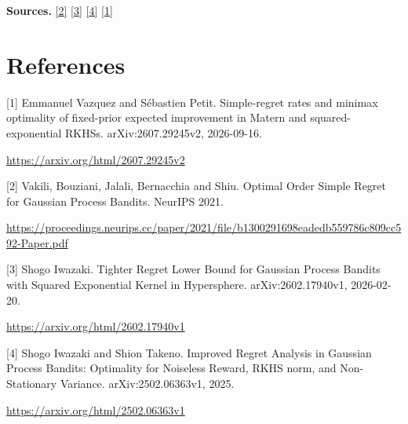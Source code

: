\documentclass[10pt,a4paper]{article}
\begin{document}
\textbf{Sources.} \href{https://proceedings.neurips.cc/paper/2021/file/b1300291698eadedb559786c809cc592-Paper.pdf}{[2]} \href{https://arxiv.org/html/2602.17940v1}{[3]} \href{https://arxiv.org/html/2502.06363v1}{[4]} \href{https://arxiv.org/html/2607.29245v2}{[1]}

\section{References}
[1] Emmanuel Vazquez and Sébastien Petit. Simple-regret rates and minimax optimality of fixed-prior expected improvement in Matern and squared-exponential RKHSs. arXiv:2607.29245v2, 2026-09-16.

\url{https://arxiv.org/html/2607.29245v2}

[2] Vakili, Bouziani, Jalali, Bernacchia and Shiu. Optimal Order Simple Regret for Gaussian Process Bandits. NeurIPS 2021.

\url{https://proceedings.neurips.cc/paper/2021/file/b1300291698eadedb559786c809cc592-Paper.pdf}

[3] Shogo Iwazaki. Tighter Regret Lower Bound for Gaussian Process Bandits with Squared Exponential Kernel in Hypersphere. arXiv:2602.17940v1, 2026-02-20.

\url{https://arxiv.org/html/2602.17940v1}

[4] Shogo Iwazaki and Shion Takeno. Improved Regret Analysis in Gaussian Process Bandits: Optimality for Noiseless Reward, RKHS norm, and Non-Stationary Variance. arXiv:2502.06363v1, 2025.

\url{https://arxiv.org/html/2502.06363v1}
\end{document}
